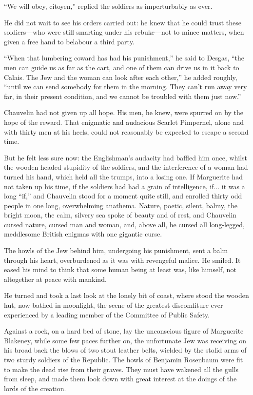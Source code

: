 \documentclass[paper=a5,BCOR=7mm,twoside,DIV=calc,12pt,usegeometry,chapterprefix,endperiod,headings=big]{scrbook}
\begin{document}
\enquote{We will obey, citoyen,} replied the soldiers as imperturbably as ever.

He did not wait to see his orders carried out: he knew that he could trust these soldiers---who were still smarting under his rebuke---not to mince matters, when given a free hand to belabour a third party.

\enquote{When that lumbering coward has had his punishment,} he said to Desgas, \enquote{the men can guide us as far as the cart, and one of them can drive us in it back to Calais. The Jew and the woman can look after each other,} he added roughly, \enquote{until we can send somebody for them in the morning. They can't run away very far, in their present condition, and we cannot be troubled with them just now.}

Chauvelin had not given up all hope. His men, he knew, were spurred on by the hope of the reward. That enigmatic and audacious Scarlet Pimpernel, alone and with thirty men at his heels, could not reasonably be expected to escape a second time.

But he felt less sure now: the Englishman's audacity had baffled him once, whilst the wooden-headed stupidity of the soldiers, and the interference of a woman had turned his hand, which held all the trumps, into a losing one. If Marguerite had not taken up his time, if the soldiers had had a grain of intelligence, if... it was a long \enquote{if,} and Chauvelin stood for a moment quite still, and enrolled thirty odd people in one long, overwhelming anathema. Nature, poetic, silent, balmy, the bright moon, the calm, silvery sea spoke of beauty and of rest, and Chauvelin cursed nature, cursed man and woman, and, above all, he cursed all long-legged, meddlesome British enigmas with one gigantic curse.

The howls of the Jew behind him, undergoing his punishment, sent a balm through his heart, overburdened as it was with revengeful malice. He smiled. It eased his mind to think that some human being at least was, like himself, not altogether at peace with mankind.

He turned and took a last look at the lonely bit of coast, where stood the wooden hut, now bathed in moonlight, the scene of the greatest discomfiture ever experienced by a leading member of the Committee of Public Safety.

Against a rock, on a hard bed of stone, lay the unconscious figure of Marguerite Blakeney, while some few paces further on, the unfortunate Jew was receiving on his broad back the blows of two stout leather belts, wielded by the stolid arms of two sturdy soldiers of the Republic. The howls of Benjamin Rosenbaum were fit to make the dead rise from their graves. They must have wakened all the gulls from sleep, and made them look down with great interest at the doings of the lords of the creation.
\end{document}
